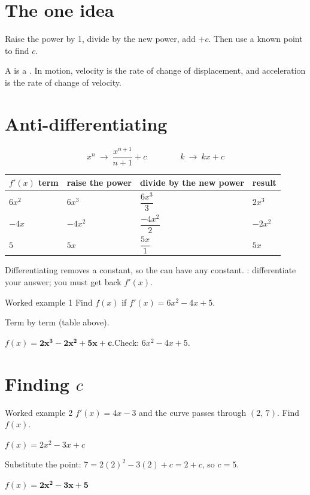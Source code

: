 \documentclass[11pt]{article}
\begin{document}

\section{The one idea}\label{idea}
\begin{keybox}
 Raise the power by 1, divide by the new power, add $+c$.
Then use a known point to find $c$.
\end{keybox}
A \tderiv is a . In motion, velocity is the rate of change of displacement,
and acceleration is the rate of change of velocity.

\section{Anti-differentiating}\label{anti}
\begin{keybox}
\[x^{n}\ \longrightarrow\ \dfrac{x^{n+1}}{n+1}+c\qquad\qquad k\ \longrightarrow\ kx+c\]
\end{keybox}
\begin{tabular}{@{}llll@{}}
\toprule
$f'(x)$ term & raise the power & divide by the new power & result\\
\midrule
$6x^{2}$ & $6x^{3}$ & $\dfrac{6x^{3}}{3}$ & $2x^{3}$\\[2mm]
$-4x$ & $-4x^{2}$ & $\dfrac{-4x^{2}}{2}$ & $-2x^{2}$\\[2mm]
$5$ & $5x$ & $\dfrac{5x}{1}$ & $5x$\\
\bottomrule
\end{tabular}

\medskip
{} Differentiating removes a constant, so the \tantider can have any constant.
: differentiate your answer; you must get back $f'(x)$.

\begin{example}{Worked example 1}
Find $f(x)$ if $f'(x)=6x^{2}-4x+5$.
\begin{steps}
\item Term by term (table above).
\item $f(x)=\mathbf{2x^{3}-2x^{2}+5x+c}$.\quad Check: $6x^{2}-4x+5$.
\end{steps}
\end{example}

\section{Finding $c$}\label{findc}
\begin{example}{Worked example 2}
$f'(x)=4x-3$ and the curve passes through $(2,\,7)$. Find $f(x)$.
\begin{steps}
\item $f(x)=2x^{2}-3x+c$
\item Substitute the point: $7=2(2)^{2}-3(2)+c=2+c$, so $c=5$.
\item $f(x)=\mathbf{2x^{2}-3x+5}$
\end{steps}
\end{example}
\end{document}
